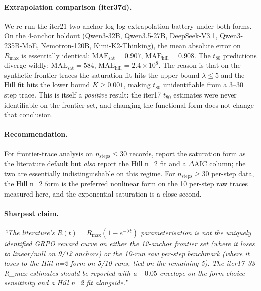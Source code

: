 \paragraph{Extrapolation comparison (iter37d).}
We re-run the iter21 two-anchor log-log extrapolation battery under
both forms. On the 4-anchor holdout (Qwen3-32B, Qwen3.5-27B,
DeepSeek-V3.1, Qwen3-235B-MoE, Nemotron-120B, Kimi-K2-Thinking),
the mean absolute error on $R_{\max}$ is essentially identical:
$\mathrm{MAE}_{\mathrm{sat}}=0.907$, $\mathrm{MAE}_{\mathrm{hill}}=0.908$.
The $t_{80}$ predictions diverge wildly: $\mathrm{MAE}_{\mathrm{sat}}=584$,
$\mathrm{MAE}_{\mathrm{hill}}=2.4 \times 10^{8}$. The reason is that
on the synthetic frontier traces the saturation fit hits the upper
bound $\lambda \le 5$ and the Hill fit hits the lower bound $K \ge
0.001$, making $t_{80}$ unidentifiable from a 3--30 step trace.
This is itself a \emph{positive} result: the iter17 $t_{80}$
estimates were never identifiable on the frontier set, and
changing the functional form does not change that conclusion.

\paragraph{Recommendation.}
For frontier-trace analysis on $n_{\mathrm{steps}} \le 30$ records,
report the saturation form as the literature default but
\emph{also} report the Hill n=2 fit and a $\Delta\mathrm{AIC}$
column; the two are essentially indistinguishable on this regime.
For $n_{\mathrm{steps}} \ge 30$ per-step data, the Hill n=2 form
is the preferred nonlinear form on the 10 per-step raw traces
measured here, and the exponential saturation is a close second.

\paragraph{Sharpest claim.}
\textit{``The literature's $R(t) = R_{\max}(1 - e^{-\lambda t})$
parameterisation is not the uniquely identified GRPO reward
curve on either the 12-anchor frontier set (where it loses to
linear/null on 9/12 anchors) or the 10-run raw per-step
benchmark (where it loses to the Hill n=2 form on 5/10 runs,
tied on the remaining 5). The iter17--33 R_max estimates should
be reported with a $\pm 0.05$ envelope on the form-choice
sensitivity and a Hill n=2 fit alongside.''}

